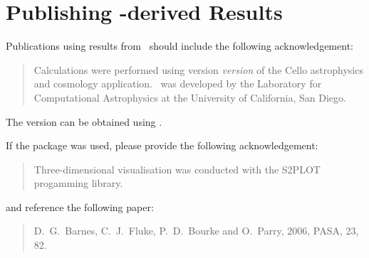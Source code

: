 \documentclass{article}
\begin{document}
% 				
% 				

\section{Publishing \cello-derived Results}

Publications using results from \cello\ should include the following
acknowledgement:

\begin{quotation}
Calculations were performed using version \textit{version} of the
Cello astrophysics and cosmology application.  \cello\ was developed
by the Laboratory for Computational Astrophysics at the University of
California, San Diego.
\end{quotation}


The version can be obtained using .  


If the  package was used, please provide the following
acknowledgement:

\begin{quotation}
  Three-dimensional visualisation was conducted with the S2PLOT
   progamming library.
\end{quotation}

and reference the following paper:

\begin{quotation}
  D.~G.~Barnes, C.~J.~Fluke, P.~D.~Bourke and O.~Parry, 2006, PASA, 23, 82.
\end{quotation}
\end{document}
